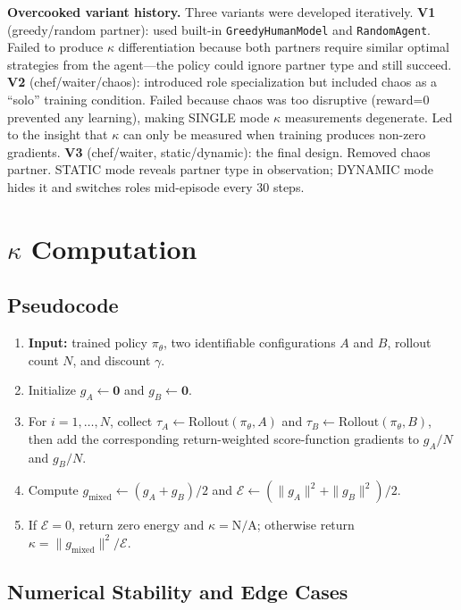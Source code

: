 \documentclass[letterpaper]{article}
\begin{document}
\medskip
\noindent\textbf{Overcooked variant history.}
Three variants were developed iteratively.
\textbf{V1} (greedy/random partner): used built-in \texttt{GreedyHumanModel} and \texttt{RandomAgent}. Failed to produce $\kappa$ differentiation because both partners require similar optimal strategies from the agent---the policy could ignore partner type and still succeed.
\textbf{V2} (chef/waiter/chaos): introduced role specialization but included chaos as a ``solo'' training condition. Failed because chaos was too disruptive (reward=0 prevented any learning), making SINGLE mode $\kappa$ measurements degenerate. Led to the insight that $\kappa$ can only be measured when training produces non-zero gradients.
\textbf{V3} (chef/waiter, static/dynamic): the final design. Removed chaos partner. STATIC mode reveals partner type in observation; DYNAMIC mode hides it and switches roles mid-episode every 30 steps.

\section{$\kappa$ Computation}

\subsection{Pseudocode}

\begin{enumerate}
\item \textbf{Input:} trained policy $\pi_\theta$, two identifiable
  configurations $A$ and $B$, rollout count $N$, and discount $\gamma$.
\item Initialize $g_A\gets\mathbf{0}$ and $g_B\gets\mathbf{0}$.
\item For $i=1,\ldots,N$, collect
  $\tau_A\gets\mathrm{Rollout}(\pi_\theta,A)$ and
  $\tau_B\gets\mathrm{Rollout}(\pi_\theta,B)$, then add the corresponding
  return-weighted score-function gradients to $g_A/N$ and $g_B/N$.
\item Compute
  $g_{\mathrm{mixed}}\gets(g_A+g_B)/2$ and
  $\mathcal{E}\gets(\|g_A\|^2+\|g_B\|^2)/2$.
\item If $\mathcal{E}=0$, return zero energy and $\kappa=\mathrm{N/A}$;
  otherwise return $\kappa=\|g_{\mathrm{mixed}}\|^2/\mathcal{E}$.
\end{enumerate}

\subsection{Numerical Stability and Edge Cases}
\end{document}
